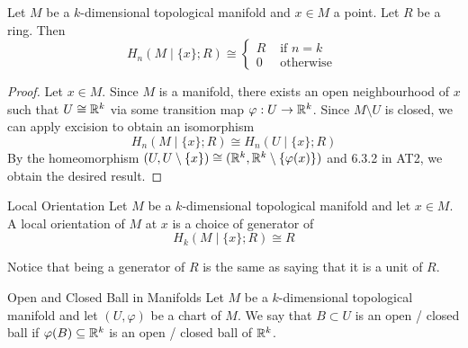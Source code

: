 \documentclass[a4paper]{article}
\begin{document}
\begin{prp}{}{} Let $M$ be a $k$-dimensional topological manifold and $x\in M$ a point. Let $R$ be a ring. Then $$H_n(M\;|\;\{x\};R)\cong\begin{cases}
R & \text{ if } n=k\\
0 & \text{ otherwise }
\end{cases}$$ \tcbline
\begin{proof}
Let $x\in M$. Since $M$ is a manifold, there exists an open neighbourhood of $x$ such that $U\cong\mathbb{R}^k$ via some transition map $\varphi:U\to\mathbb{R}^k$. Since $M\setminus U$ is closed, we can apply excision to obtain an isomorphism $$H_n(M\;|\;\{x\};R)\cong H_n(U\;|\;\{x\};R)$$ By the homeomorphism $(U,U\setminus\{x\})\cong(\mathbb{R}^k,\mathbb{R}^k\setminus\{\varphi(x)\})$ and 6.3.2 in AT2, we obtain the desired result. 
\end{proof}
\end{prp}

\begin{defn}{Local Orientation}{} Let $M$ be a $k$-dimensional topological manifold and let $x\in M$. A local orientation of $M$ at $x$ is a choice of generator of $$H_k(M\;|\;\{x\};R)\cong R$$
\end{defn}

Notice that being a generator of $R$ is the same as saying that it is a unit of $R$. 

\begin{defn}{Open and Closed Ball in Manifolds}{} Let $M$ be a $k$-dimensional topological manifold and let $(U,\varphi)$ be a chart of $M$. We say that $B\subset U$ is an open / closed ball if $\varphi(B)\subseteq\mathbb{R}^k$ is an open / closed ball of $\mathbb{R}^k$. 
\end{defn}
\end{document}
